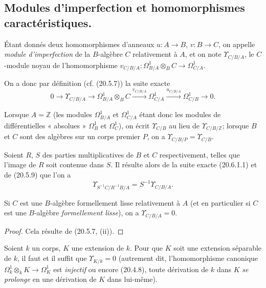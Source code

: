 \subsection{Modules d'imperfection et homomorphismes caractéristiques.}
\label{subsection:0.20.6-fr}
\label{0.20.6-fr}

\begin{definition}[20.6.1]
\label{0.20.6.1-fr}
Étant donnés deux homomorphismes d'anneaux $u:A\to B$, $v:B\to C$, on
appelle \emph{module d'imperfection} de la $B$-algèbre $C$ relativement à
$A$, et on note $\Upsilon_{C/B/A}$, le $C$-module noyau de
l'homomorphisme
$v_{C/B/A}:\Omega^1_{B/A}\otimes_B C\to\Omega^1_{C/A}$.
\end{definition}

On a donc par définition (cf. (20.5.7)) la suite exacte
\begin{equation}
\tag{20.6.1.1}
\label{0.20.6.1.1-fr}
  0\longrightarrow\Upsilon_{C/B/A}\longrightarrow
  \Omega^1_{B/A}\otimes_B C\xrightarrow{v_{C/B/A}}
  \Omega^1_{C/A}\xrightarrow{u_{C/B/A}}\Omega^1_{C/B}
  \longrightarrow0.
\end{equation}

Lorsque $A=\mathbb{Z}$ (les modules $\Omega^1_{B/A}$ et $\Omega^1_{C/A}$
étant donc les modules de différentielles « absolues » $\Omega^1_B$ et
$\Omega^1_C$), on écrit $\Upsilon_{C/B}$ au lieu de
$\Upsilon_{C/B/\mathbb{Z}}$; lorsque $B$ et $C$ sont des algèbres sur un
corps premier $P$, on a $\Upsilon_{C/B/P}=\Upsilon_{C/B}$.

Soient $R$, $S$ des parties multiplicatives de $B$ et $C$ respectivement,
telles que l'image de $R$ soit contenue dans $S$. Il résulte alors de la
suite exacte (20.6.1.1) et de (20.5.9) que l'on a
\begin{equation}
\tag{20.6.1.2}
\label{0.20.6.1.2-fr}
  \Upsilon_{S^{-1}C/R^{-1}B/A}=S^{-1}\Upsilon_{C/B/A}.
\end{equation}

\begin{proposition}[20.6.2]
\label{0.20.6.2-fr}
Si $C$ est une $B$-algèbre formellement lisse relativement à $A$ \textup{(et en
particulier si $C$ est une $B$-algèbre \emph{formellement lisse})}, on a
$\Upsilon_{C/B/A}=0$.
\end{proposition}

\begin{proof}
Cela résulte de (20.5.7, (ii)).
\end{proof}

\begin{proposition}[20.6.3]
\label{0.20.6.3-fr}
Soient $k$ un corps, $K$ une extension de $k$. Pour que $K$ soit une
extension séparable de $k$, il faut et il suffit que $\Upsilon_{K/k}=0$
\textup{(autrement dit, l'homomorphisme canonique
$\Omega^1_k\otimes_k K\to\Omega^1_K$ est \emph{injectif} ou encore (20.4.8),
toute dérivation de $k$ dans $K$ \emph{se prolonge} en une dérivation de $K$
dans lui-même)}.
\end{proposition}

